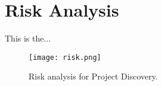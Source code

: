 \section{Risk Analysis}\label{sec:riskanalysis}

This is the...

\begin{figure}[H]
\centering
\graphicspath{ {./graphics/} }
\centerline{\texttt{[image: risk.png]}}
\caption{\label{fig:risk} Risk analysis for Project Discovery.}
\end{figure}
